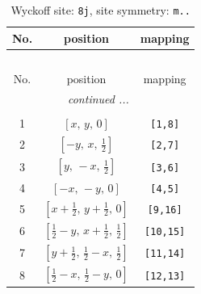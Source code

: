 \documentclass[fleqn,8pt]{jsarticle}
\begin{document}
\begin{longtable}{ccc}
\caption{Wyckoff site: {\tt 8j}, site symmetry: {\tt m..}}
 \\
 \hline \hline
No. & position & mapping \\ \hline \endfirsthead

\multicolumn{2}{l}{\tablename\ \thetable{}} \\
 \hline \hline
No. & position & mapping \\ \hline \endhead

 \hline \hline
\multicolumn{2}{r}{\footnotesize\it continued ...} \\ \endfoot

 \hline \hline
\multicolumn{2}{r}{} \\ \endlastfoot

1 & $\left[ x,\, y,\, 0 \right]$ & {\tt [1,8]} \\ \hline
2 & $\left[ - y,\, x,\, \frac{1}{2} \right]$ & {\tt [2,7]} \\ \hline
3 & $\left[ y,\, - x,\, \frac{1}{2} \right]$ & {\tt [3,6]} \\ \hline
4 & $\left[ - x,\, - y,\, 0 \right]$ & {\tt [4,5]} \\ \hline
5 & $\left[ x + \frac{1}{2},\, y + \frac{1}{2},\, 0 \right]$ & {\tt [9,16]} \\ \hline
6 & $\left[ \frac{1}{2} - y,\, x + \frac{1}{2},\, \frac{1}{2} \right]$ & {\tt [10,15]} \\ \hline
7 & $\left[ y + \frac{1}{2},\, \frac{1}{2} - x,\, \frac{1}{2} \right]$ & {\tt [11,14]} \\ \hline
8 & $\left[ \frac{1}{2} - x,\, \frac{1}{2} - y,\, 0 \right]$ & {\tt [12,13]} \\
\end{longtable}
\renewcommand{\arraystretch}{1.2}
\end{document}
